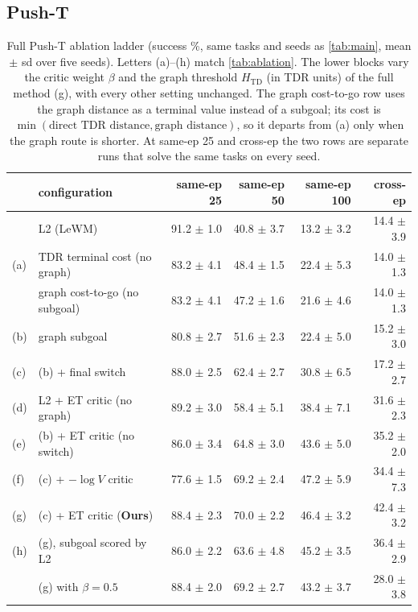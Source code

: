 \documentclass{article} %
\newcommand{\Htd}{H_{\mathrm{TD}}}
\begin{document}
\subsection{Push-T}
\label{app:ablation-pusht}
\begin{table}[h]
\centering\small
\caption{Full Push-T ablation ladder (success \%, same tasks and seeds as \cref{tab:main}, mean
$\pm$ sd over five seeds). Letters (a)--(h) match \cref{tab:ablation}. The lower blocks vary the
critic weight $\beta$ and the graph threshold $\Htd$ (in TDR units) of the full method (g), with
every other setting unchanged. The graph cost-to-go row uses the graph distance as a terminal value
instead of a subgoal; its cost is $\min(\text{direct TDR distance},\text{graph distance})$, so it
departs from (a) only when the graph route is shorter. At same-ep 25 and cross-ep the two rows
are separate runs that solve the same tasks on every seed.}
\label{tab:ladder}
\begin{tabular}{@{}l>{\raggedright\arraybackslash}p{4.3cm}rrrr@{}}
\toprule
& configuration & same-ep 25 & same-ep 50 & same-ep 100 & cross-ep \\
\midrule
& L2 (LeWM) & 91.2 $\pm$ 1.0 & 40.8 $\pm$ 3.7 & 13.2 $\pm$ 3.2 & 14.4 $\pm$ 3.9 \\
(a) & TDR terminal cost (no graph) & 83.2 $\pm$ 4.1 & 48.4 $\pm$ 1.5 & 22.4 $\pm$ 5.3 & 14.0 $\pm$ 1.3 \\
& graph cost-to-go (no subgoal) & 83.2 $\pm$ 4.1 & 47.2 $\pm$ 1.6 & 21.6 $\pm$ 4.6 & 14.0 $\pm$ 1.3 \\
(b) & graph subgoal & 80.8 $\pm$ 2.7 & 51.6 $\pm$ 2.3 & 22.4 $\pm$ 5.0 & 15.2 $\pm$ 3.0 \\
(c) & (b) + final switch & 88.0 $\pm$ 2.5 & 62.4 $\pm$ 2.7 & 30.8 $\pm$ 6.5 & 17.2 $\pm$ 2.7 \\
\midrule
(d) & L2 + ET critic (no graph) & 89.2 $\pm$ 3.0 & 58.4 $\pm$ 5.1 & 38.4 $\pm$ 7.1 & 31.6 $\pm$ 2.3 \\
(e) & (b) + ET critic (no switch) & 86.0 $\pm$ 3.4 & 64.8 $\pm$ 3.0 & 43.6 $\pm$ 5.0 & 35.2 $\pm$ 2.0 \\
(f) & (c) + $-\log V$ critic & 77.6 $\pm$ 1.5 & 69.2 $\pm$ 2.4 & 47.2 $\pm$ 5.9 & 34.4 $\pm$ 7.3 \\
(g) & (c) + ET critic (\textbf{Ours}) & 88.4 $\pm$ 2.3 & 70.0 $\pm$ 2.2 & 46.4 $\pm$ 3.2 & 42.4 $\pm$ 3.2 \\
(h) & (g), subgoal scored by L2 & 86.0 $\pm$ 2.2 & 63.6 $\pm$ 4.8 & 45.2 $\pm$ 3.5 & 36.4 $\pm$ 2.9 \\
\midrule
& (g) with $\beta=0.5$ & 88.4 $\pm$ 2.0 & 69.2 $\pm$ 2.7 & 43.2 $\pm$ 3.7 & 28.0 $\pm$ 3.8 \\

\end{tabular}
\end{table}
\end{document}
